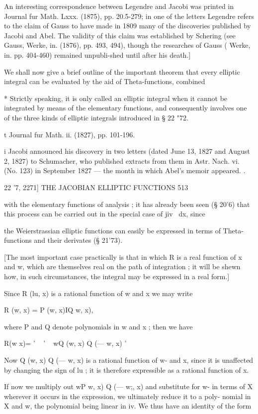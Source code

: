 An interesting correspondence between Legendre and Jacobi was printed
in Journal fur Math. Lxxx. (1875), pp. 20.5-279; in one of the letters
Legendre refers to the claim of Gauss to have made in 1809 many of the
discoveries published by Jacobi and Abel. The validity of this claim
was established by Schering (see Gauss, Werke, in. (1876), pp. 493,
494), though the researches of Gauss ( Werke, in. pp. 404-460)
remained unpubli-shed until after his death.]

We shall now give a brief outline of the important theorem that every
elliptic integral can be evaluated by the aid of Theta-functions,
combined

* Strictly speaking, it is only called an elliptic integral when it
cannot be integrated by means of the elementary functions, and
consequently involves one of the three kinds of elliptic integrals
introduced in § 22 "72.

t Journal fur Math. ii. (1827), pp. 101-196.

i Jacobi announced his discovery in two letters (dated June 13, 1827
and August 2, 1827) to Schumacher, who published extracts from them in
Astr. Nach. vi. (No. 123) in September 1827 — the month in which
Abel's memoir appeared. .

22 '7, 2271] THE JACOBIAN ELLIPTIC FUNCTIONS 513

with the elementary functions of analysis ; it has already been seen
(§ 20'6) that this process can be carried out in the special case of
jiv~ dx, since

the Weierstrassian elliptic functions can easily be expressed in terms
of Theta-functions and their derivates (§ 21'73).

[The most important case practically is that in which R is a real
function of x and w, which are themselves real on the path of
integration ; it will be shewn how, in such circumstances, the
integral may be expressed in a real form.]

Since R (lu, x) is a rational function of w and x we may write

R (w, x) = P (w, x)IQ w, x),

where P and Q denote polynomials in w and x ; then we have

R(w x)= ' ~ ' ~ wQ (w, x) Q (— w, x) '

Now Q (w, x) Q (— w, x) is a rational function of w- and x, since it
is unaffected by changing the sign of lu ; it is therefore expressible
as a rational function of x.

If now we multiply out wP w, x) Q (— w;, x) and substitute for w- in
terms of X wherever it occurs in the expression, we ultimately reduce
it to a poly- nomial in X and w, the polynomial being linear in iv. We
thus have an identity of the form

